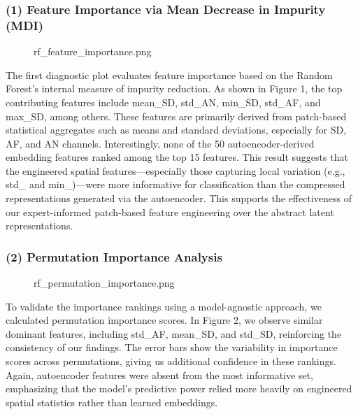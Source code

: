 \documentclass[11pt]{article}
\begin{document}
\subsubsection*{(1) Feature Importance via Mean Decrease in Impurity
(MDI)}\label{feature-importance-via-mean-decrease-in-impurity-mdi}

\begin{figure}
\centering
{}
\caption{rf\_feature\_importance.png}
\end{figure}

The first diagnostic plot evaluates feature importance based on the
Random Forest's internal measure of impurity reduction. As shown in
Figure 1, the top contributing features include mean\_SD, std\_AN,
min\_SD, std\_AF, and max\_SD, among others. These features are
primarily derived from patch-based statistical aggregates such as means
and standard deviations, especially for SD, AF, and AN channels.
Interestingly, none of the 50 autoencoder-derived embedding features
ranked among the top 15 features. This result suggests that the
engineered spatial features---especially those capturing local variation
(e.g., std\_ and min\_)---were more informative for classification than
the compressed representations generated via the autoencoder. This
supports the effectiveness of our expert-informed patch-based feature
engineering over the abstract latent representations.

\subsubsection*{(2) Permutation Importance
Analysis}\label{permutation-importance-analysis}

\begin{figure}
\centering
{}
\caption{rf\_permutation\_importance.png}
\end{figure}

To validate the importance rankings using a model-agnostic approach, we
calculated permutation importance scores. In Figure 2, we observe
similar dominant features, including std\_AF, mean\_SD, and std\_SD,
reinforcing the consistency of our findings. The error bars show the
variability in importance scores across permutations, giving us
additional confidence in these rankings. Again, autoencoder features
were absent from the most informative set, emphasizing that the model's
predictive power relied more heavily on engineered spatial statistics
rather than learned embeddings.
\end{document}
